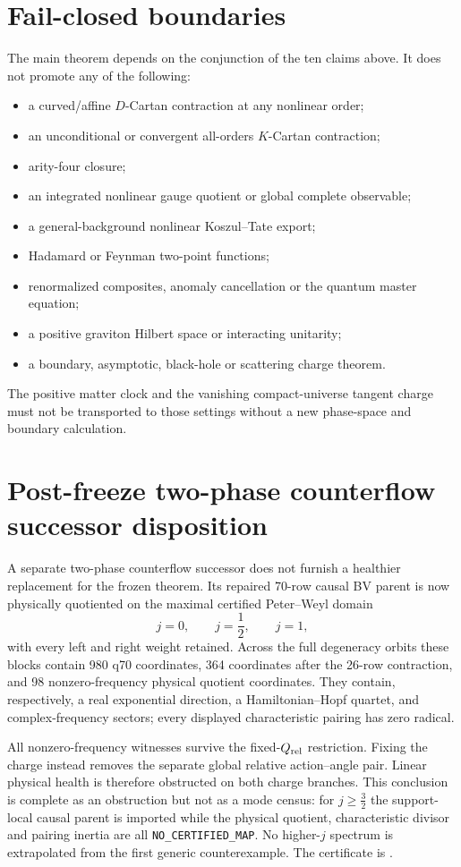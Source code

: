 \documentclass[11pt]{article}
\begin{document}
\section{Fail-closed boundaries}

The main theorem depends on the conjunction of the ten claims above.  It does
not promote any of the following:
\begin{itemize}
\item a curved/affine $D$-Cartan contraction at any nonlinear order;
\item an unconditional or convergent all-orders $K$-Cartan contraction;
\item arity-four closure;
\item an integrated nonlinear gauge quotient or global complete observable;
\item a general-background nonlinear Koszul--Tate export;
\item Hadamard or Feynman two-point functions;
\item renormalized composites, anomaly cancellation or the quantum master
equation;
\item a positive graviton Hilbert space or interacting unitarity;
\item a boundary, asymptotic, black-hole or scattering charge theorem.
\end{itemize}
The positive matter clock and the vanishing compact-universe tangent charge
must not be transported to those settings without a new phase-space and
boundary calculation.

\section{Post-freeze two-phase counterflow successor disposition}

A separate two-phase counterflow successor does not furnish a healthier
replacement for the frozen theorem.  Its repaired 70-row causal BV parent is
now physically quotiented on the maximal certified Peter--Weyl domain
\[
 j=0,\qquad j=\frac12,\qquad j=1,
\]
with every left and right weight retained.  Across the full degeneracy
orbits these blocks contain 980 q70 coordinates, 364 coordinates after the
26-row contraction, and 98 nonzero-frequency physical quotient coordinates.
They contain, respectively, a real exponential direction, a
Hamiltonian--Hopf quartet, and complex-frequency sectors; every displayed
characteristic pairing has zero radical.

All nonzero-frequency witnesses survive the fixed-$Q_{\rm rel}$ restriction.
Fixing the charge instead removes the separate global relative action--angle
pair.  Linear physical health is therefore obstructed on both charge
branches.  This conclusion is complete as an obstruction but not as a mode
census: for $j\ge\frac32$ the support-local causal parent is imported while
the physical quotient, characteristic divisor and pairing inertia are all
\texttt{NO\_CERTIFIED\_MAP}.  No higher-$j$ spectrum is extrapolated from the
first generic counterexample.  The certificate is
.
\end{document}
